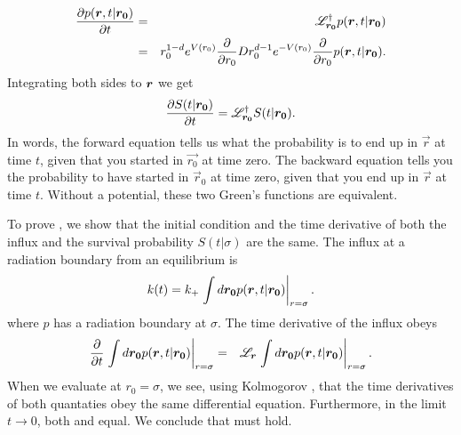 \begin{eqnarray}
 \elabel{backward_eqn}
 \pdiff{p(\vect{r},t|\vect{r_0})}{t} & = & \mathscr{L}_{\vect{r_0}}^{\dag} p(\vect{r},t|\vect{r_0}) \\
 & = & r_0^{1-d} e^{V(r_0)} \pdiff{}{r_0} D r_0^{d-1} e^{-V(r_0)} \pdiff{}{r_0} p(\vect{r},t|\vect{r_0}). 
\end{eqnarray}
Integrating both sides to $\boldsymbol{r}$ we get
\begin{equation}
 \pdiff{S(t|\vect{r_0})}{t} = \mathscr{L}_{\vect{r_0}}^{\dag} S(t|\vect{r_0}).
 \elabel{S_eqn}
\end{equation}
In words, the forward equation tells us what the probability is to end up in $\vec{r}$ at time $t$, given that you started in $\vec{r_0}$ at time zero. The backward equation tells you the probability to have started in $\vec{r}_0$ at time zero, given that you end up in $\vec{r}$ at time $t$. Without a potential, these two Green's functions are equivalent.

To prove , we show that the initial condition and the time derivative of both the influx and the survival probability $S(t|\sigma)$ are the same. The influx at a radiation boundary from an equilibrium is
\begin{equation}
 k(t) = k_+ \left. \int d\vect{r_0} p(\vect{r},t|\vect{r_0}) \right|_{r=\sigma}.
 \elabel{bsm_3}
\end{equation}
where $p$ has a radiation boundary at $\sigma$. The time derivative of the influx obeys
\begin{eqnarray}
 \frac{\partial }{\partial t} \left. \int d\boldsymbol{r_0} p(\boldsymbol{r},t|\boldsymbol{r_0}) \right|_{r=\sigma} & = & \mathscr{L}_{\boldsymbol{r}} \left. \int d\boldsymbol{r_0} p(\boldsymbol{r},t|\boldsymbol{r_0}) \right|_{r=\sigma}.
\end{eqnarray}
When we evaluate  at $r_0=\sigma$, we see, using Kolmogorov , that the time derivatives of both quantaties obey the same differential equation. Furthermore, in the limit $t \to 0$, both  and  equal. We conclude that  must hold.


